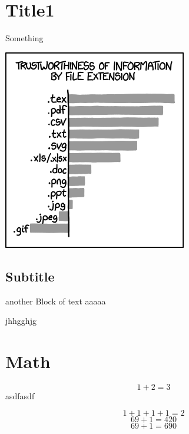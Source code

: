 
\section{Title1}
Something

\includegraphics{image.png}
\subsection{Subtitle}
another Block of text
aaaaa

jhhgghjg

\section{Math}
$$1+2 = 3$$
asdfasdf

\[1+1+1+1=2\]
\begin{displaymath}
69 + 1 = 420
\end{displaymath}
\begin{equation}
69 + 1 = 690
\end{equation}
